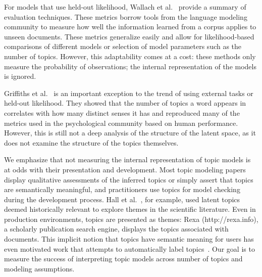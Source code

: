 For models that use held-out likelihood, Wallach et
al.~\cite{wallach-09} provide a summary of evaluation
techniques. These metrics borrow tools from the language modeling
community to measure how well the information learned from a corpus
applies to unseen documents.  These metrics generalize easily and
allow for likelihood-based comparisons of different models or
selection of model parameters such as the number of topics.  However,
this adaptability comes at a cost: these methods only measure the
probability of observations; the internal representation of the models
is ignored.

Griffiths et al.~\cite{griffiths-06} is an important exception to the
trend of using external tasks or held-out likelihood.  They showed
that the number of topics a word appears in correlates with how many
distinct senses it has and reproduced many of the metrics used in the
psychological community based on human performance.  However, this is
still not a deep analysis of the structure of the latent space, as it
does not examine the structure of the topics themselves.

We emphasize that not measuring the internal representation of topic
models is at odds with their presentation and development.  Most topic
modeling papers display qualitative assessments of the inferred topics
or simply assert that topics are semantically meaningful, and
practitioners use topics for model checking during the development
process.  Hall et al.~\cite{hall-08}, for example, used latent topics
deemed historically relevant to explore themes in the scientific
literature.  Even in production environments, topics are presented as
themes: Rexa (http://rexa.info), a scholarly publication search
engine, displays the topics associated with documents.  This implicit
notion that topics have semantic meaning for users has even
motivated work that attempts to automatically label
topics~\cite{mei-07}.  Our goal is to measure the success of
interpreting topic models across number of topics and modeling
assumptions.
